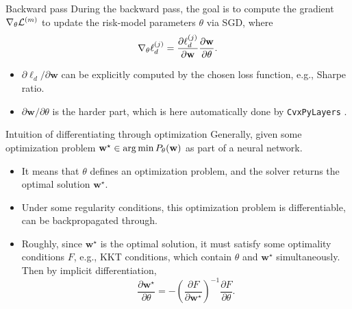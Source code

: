 \documentclass[10pt,aspectratio=169]{beamer}
\newcommand{\Loss}{\mathcal{L}}
\newcommand{\Param}{\theta}
\begin{document}
\begin{frame}{Backward pass}
\footnotesize
  \setlength{\abovedisplayskip}{0.35em}
  \setlength{\belowdisplayskip}{0.35em}
  During the backward pass, the goal is to compute the gradient $\grad_\Param \Loss^{(m)}$ to update the risk-model parameters $\Param$ via SGD, where 
  \[
    \grad_\Param \ell_d^{(j)}
    =
    \frac{\partial \ell_d^{(j)}}{\partial \mathbf{w}}
    \frac{\partial \mathbf{w}}{\partial \Param}.
  \]

  \begin{itemize}
    \setlength{\itemsep}{0.15em}
    \item $\partial \ell_d/\partial \mathbf{w}$ can be explicitly computed by the chosen loss function, e.g., Sharpe ratio.
    \item $\partial \mathbf{w}/\partial\Param$ is the harder part, which is here automatically done by \texttt{CvxPyLayers} \parencite{AgrawalAmosEtAl2019Layers}.
  \end{itemize}

  \begin{block}{\footnotesize Intuition of differentiating through optimization}
    \footnotesize
        \vspace{0.4em}
    Generally, given some optimization problem $\mathbf{w}^\star \in \argmin P_\Param(\mathbf{w})$ as part of a neural network.
    \begin{itemize}
      \setlength{\itemsep}{0.1em}
      \item It means that $\Param$ defines an optimization problem, and the solver returns the optimal solution $\mathbf{w}^\star$. 
      \item Under some regularity conditions, this optimization problem is differentiable, can be backpropagated through.
      \item Roughly, since $\mathbf{w}^\star$ is the optimal solution, it must satisfy some optimality conditions $F$, e.g., KKT conditions, which contain $\Param$ and $\mathbf{w}^\star$ simultaneously. Then by implicit differentiation,
      \[
       \frac{\partial \mathbf{w}^\star}{\partial \Param} = -\left(\frac{\partial F}{\partial \mathbf{w}^\star}\right)^{-1} \frac{\partial F}{\partial \Param}.
      \]
    \end{itemize}
  \end{block}
\end{frame}
\end{document}
